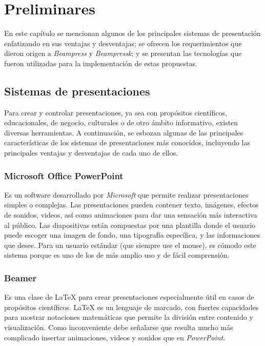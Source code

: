 \chapter{Preliminares} %
\label{cha:preliminares}

	En este capítulo se mencionan algunos de los principales sistemas de presentación enfatizando en sus ventajas y desventajas; se ofrecen los requerimientos que dieron origen a \textit{Beampress} y \textit{Beampressk}; y se presentan las tecnologías que fueron utilizadas para la implementación de estas propuestas.	

	\section{Sistemas de presentaciones} %
	\label{sec:sistemas_de_presentaciones}
		Para crear y controlar presentaciones, ya sea con propósitos científicos, educacionales, de negocio, culturales o de otro ámbito informativo, existen diversas herramientas. A continuación, se esbozan algunas de las principales características de los sistemas de presentaciones más conocidos, incluyendo las principales ventajas y desventajas de cada uno de ellos.	
		\subsection{Microsoft Office PowerPoint} %
		\label{sub:microsoft_office_power_point}

			Es un software desarrollado por \textit{Microsoft}  que permite realizar presentaciones simples o complejas. Las presentaciones pueden contener texto, imágenes, efectos de sonidos, videos, así como animaciones para dar una sensación más interactiva al público. Las diapositivas están compuestas por una plantilla donde el usuario puede escoger una imagen de fondo, una tipografía específica, y las informaciones que desee. Para un usuario estándar (que siempre use el mouse), es cómodo este sistema porque es uno de los de más amplio uso y de fácil comprensión. 


		\subsection{Beamer} %
		\label{sub:beamer}

			Es una clase de \LaTeX{} para crear presentaciones especialmente útil en casos de propósitos científicos. \LaTeX{} es un lenguaje de marcado, con fuertes capacidades para mostrar notaciones matemáticas que permite la división entre contenido y visualización. Como inconveniente debe señalarse que resulta mucho más complicado insertar animaciones, videos y sonidos que en \textit{PowerPoint}.


